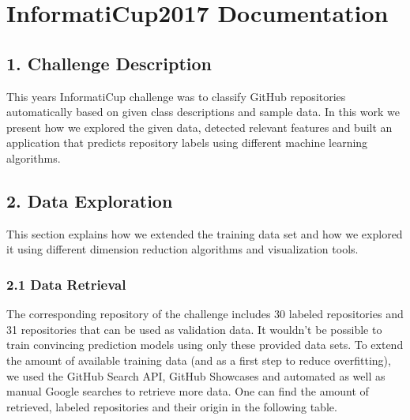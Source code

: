 \documentclass{article}
\begin{document}
\section{InformatiCup2017
Documentation}\label{informaticup2017-documentation}

\subsection{1. Challenge Description}\label{challenge-description}

This years InformatiCup challenge was to classify GitHub repositories
automatically based on given class descriptions and sample data. In this
work we present how we explored the given data, detected relevant
features and built an application that predicts repository labels using
different machine learning algorithms.

\subsection{2. Data Exploration}\label{data-exploration}

This section explains how we extended the training data set and how we
explored it using different dimension reduction algorithms and
visualization tools.

\subsubsection{2.1 Data Retrieval}\label{data-retrieval}

The corresponding repository of the challenge includes 30 labeled
repositories and 31 repositories that can be used as validation data. It
wouldn't be possible to train convincing prediction models using only
these provided data sets. To extend the amount of available training
data (and as a first step to reduce overfitting), we used the GitHub
Search API, GitHub Showcases and automated as well as manual Google
searches to retrieve more data. One can find the amount of retrieved,
labeled repositories and their origin in the following table.
\end{document}
